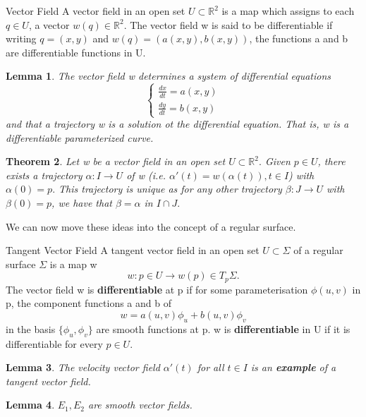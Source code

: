 \documentclass[twoside]{article}
\newcounter{lecnum}
\newtheorem{theorem}{Theorem}[lecnum]
\newtheorem{lemma}[theorem]{Lemma}
\begin{document}
\begin{definition_exam}{Vector Field}{} A vector field in an open set $U \subset \mathbb{R}^2$ is a map which assigns to each $q \in U$, a vector $w(q) \in \mathbb{R}^2$. The vector field w is said to be differentiable if writing $q = (x,y)$ and $w(q) = (a(x,y), b(x,y))$, the functions a and b are differentiable functions in U.
\end{definition_exam}

\begin{lemma}The vector field w determines a system of differential equations 
$$
\begin{cases}
\frac{dx}{dt} = a(x,y)\\
\frac{dy}{dt} = b(x,y)
\end{cases}
$$
and that a trajectory w is a solution ot the differential equation. That is, w is a differentiable parameterized curve.
\end{lemma}
\begin{theorem}Let w be a vector field in an open set $U \subset \mathbb{R}^2.$ Given $p \in U$, there exists a trajectory $\alpha:I \rightarrow U$ of w (i.e. $\alpha'(t) = w(\alpha(t)), t \in I$)  with $\alpha(0) = p.$ This trajectory is unique as for any other trajectory $\beta: J \rightarrow U$ with $\beta(0) = p$, we have that $\beta = \alpha$ in $I \cap J.$ 
\end{theorem}

We can now move these ideas into the concept of a regular surface.

\begin{definition_exam}{Tangent Vector Field}{} A tangent vector field in an open set $U \subset \Sigma$ of a regular surface $\Sigma$ is a map w 
$$
w: p \in U \rightarrow w(p) \in T_p\Sigma.
$$
The vector field w is \textbf{differentiable} at p if for some parameterisation $\phi(u,v)$ in p, the component functions a and b of 
$$
w = a(u,v)\phi_u + b(u,v)\phi_v
$$
in the basis $\{\phi_u, \phi_v\}$ are smooth functions at p. w is \textbf{differentiable} in U if it is differentiable for every $p \in U.$
\end{definition_exam}


\begin{lemma}The velocity vector field $\alpha'(t)$ for all $t \in I$ is an \textbf{example} of a tangent vector field.
\end{lemma}

\begin{lemma}$E_1, E_2$ are smooth vector fields.
\end{lemma}
\end{document}
